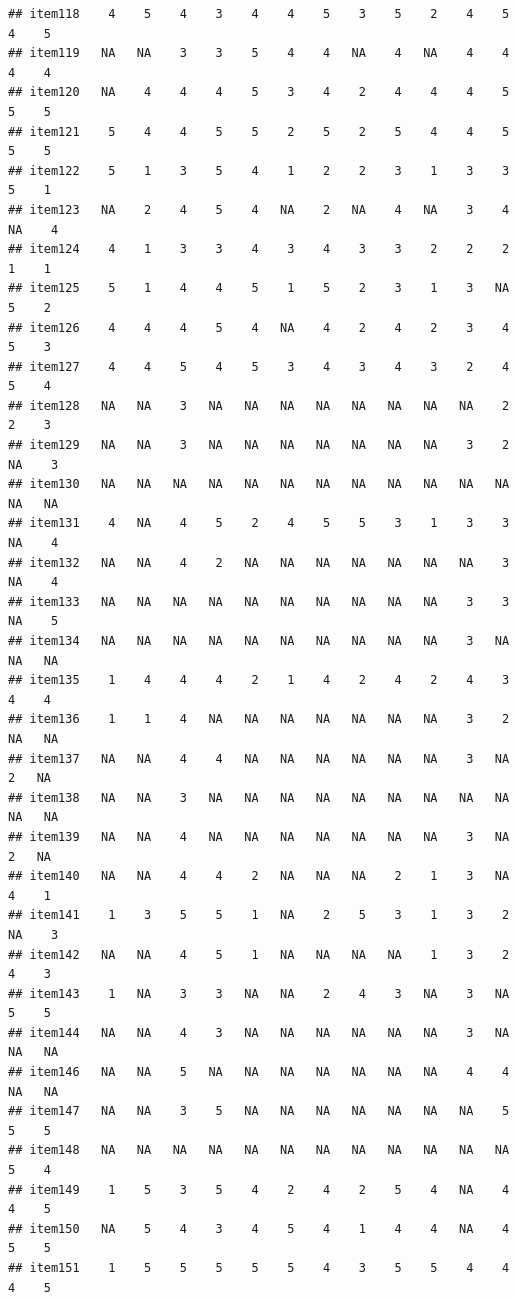 \documentclass[
  man]{apa6}
\begin{document}
\begin{verbatim}
## item118    4    5    4    3    4    4    5    3    5    2    4    5    4    5
## item119   NA   NA    3    3    5    4    4   NA    4   NA    4    4    4    4
## item120   NA    4    4    4    5    3    4    2    4    4    4    5    5    5
## item121    5    4    4    5    5    2    5    2    5    4    4    5    5    5
## item122    5    1    3    5    4    1    2    2    3    1    3    3    5    1
## item123   NA    2    4    5    4   NA    2   NA    4   NA    3    4   NA    4
## item124    4    1    3    3    4    3    4    3    3    2    2    2    1    1
## item125    5    1    4    4    5    1    5    2    3    1    3   NA    5    2
## item126    4    4    4    5    4   NA    4    2    4    2    3    4    5    3
## item127    4    4    5    4    5    3    4    3    4    3    2    4    5    4
## item128   NA   NA    3   NA   NA   NA   NA   NA   NA   NA   NA    2    2    3
## item129   NA   NA    3   NA   NA   NA   NA   NA   NA   NA    3    2   NA    3
## item130   NA   NA   NA   NA   NA   NA   NA   NA   NA   NA   NA   NA   NA   NA
## item131    4   NA    4    5    2    4    5    5    3    1    3    3   NA    4
## item132   NA   NA    4    2   NA   NA   NA   NA   NA   NA   NA    3   NA    4
## item133   NA   NA   NA   NA   NA   NA   NA   NA   NA   NA    3    3   NA    5
## item134   NA   NA   NA   NA   NA   NA   NA   NA   NA   NA    3   NA   NA   NA
## item135    1    4    4    4    2    1    4    2    4    2    4    3    4    4
## item136    1    1    4   NA   NA   NA   NA   NA   NA   NA    3    2   NA   NA
## item137   NA   NA    4    4   NA   NA   NA   NA   NA   NA    3   NA    2   NA
## item138   NA   NA    3   NA   NA   NA   NA   NA   NA   NA   NA   NA   NA   NA
## item139   NA   NA    4   NA   NA   NA   NA   NA   NA   NA    3   NA    2   NA
## item140   NA   NA    4    4    2   NA   NA   NA    2    1    3   NA    4    1
## item141    1    3    5    5    1   NA    2    5    3    1    3    2   NA    3
## item142   NA   NA    4    5    1   NA   NA   NA   NA    1    3    2    4    3
## item143    1   NA    3    3   NA   NA    2    4    3   NA    3   NA    5    5
## item144   NA   NA    4    3   NA   NA   NA   NA   NA   NA    3   NA   NA   NA
## item146   NA   NA    5   NA   NA   NA   NA   NA   NA   NA    4    4   NA   NA
## item147   NA   NA    3    5   NA   NA   NA   NA   NA   NA   NA    5    5    5
## item148   NA   NA   NA   NA   NA   NA   NA   NA   NA   NA   NA   NA    5    4
## item149    1    5    3    5    4    2    4    2    5    4   NA    4    4    5
## item150   NA    5    4    3    4    5    4    1    4    4   NA    4    5    5
## item151    1    5    5    5    5    5    4    3    5    5    4    4    4    5

\end{verbatim}
\end{document}

